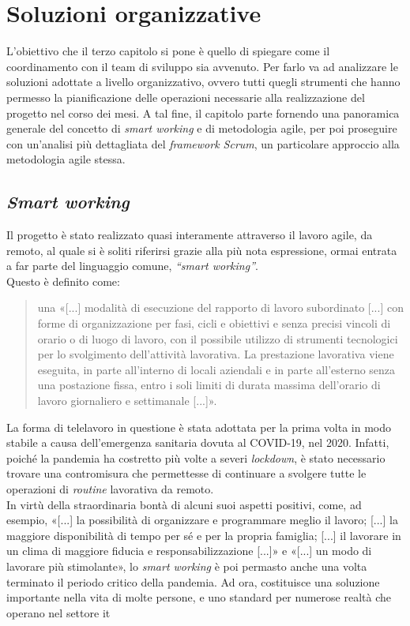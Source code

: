 
\chapter{Soluzioni organizzative}
L'obiettivo che il terzo capitolo si pone è quello di spiegare come il coordinamento con il team di sviluppo sia avvenuto. Per farlo va ad analizzare le soluzioni adottate a livello organizzativo, ovvero tutti quegli strumenti che hanno permesso la pianificazione delle operazioni necessarie alla realizzazione del progetto nel corso dei mesi. A tal fine, il capitolo parte fornendo una panoramica generale del concetto di \textit{smart working} e di metodologia agile, per poi proseguire con un'analisi più dettagliata del \textit{framework Scrum}, un particolare approccio alla metodologia agile stessa. 

\section{\textit{Smart working}}
\label{sec:Smart working}
Il progetto è stato realizzato quasi interamente attraverso il lavoro agile, da remoto, al quale si è soliti riferirsi grazie alla più nota espressione, ormai entrata a far parte del linguaggio comune, \textit{“smart working”}.\\
Questo è definito come:
\begin{quote}
una «[...] modalità di esecuzione  del rapporto di lavoro subordinato  [...] con forme di organizzazione per fasi, cicli e  obiettivi e senza precisi vincoli di orario  o  di  luogo  di  lavoro,  con  il
possibile  utilizzo  di  strumenti  tecnologici  per  lo  svolgimento dell'attività lavorativa. La prestazione lavorativa viene  eseguita, in parte all'interno di locali aziendali e in parte all'esterno senza una  postazione  fissa,  entro  i  soli  limiti  di  durata   massima
dell'orario di lavoro  giornaliero  e  settimanale [...]»\cite{Stato_SmartWorking}.
\end{quote}

La forma di telelavoro in questione è stata adottata per la prima volta in modo stabile a causa dell'emergenza sanitaria dovuta al COVID-19, nel 2020. Infatti, poiché la pandemia ha costretto più volte a severi \textit{lockdown}, è stato necessario trovare una contromisura che permettesse di continuare a svolgere tutte le operazioni di \textit{routine} lavorativa da remoto.\\
In virtù della straordinaria bontà di alcuni suoi aspetti positivi, come, ad esempio, «[...] la possibilità di organizzare e programmare meglio il lavoro; [...] la maggiore disponibilità di tempo per sé e per la propria famiglia; [...] il lavorare in un clima di maggiore fiducia e responsabilizzazione [...]» e «[...] un modo di lavorare più stimolante»\cite{DeMasi_SmartWorkingRivoluzioneLavoroIntelligente}, lo \textit{smart working} è poi permasto anche una volta terminato il periodo critico della pandemia. Ad ora, costituisce una soluzione importante nella vita di molte persone, e uno standard per numerose realtà che operano nel settore \acrfull{it}

